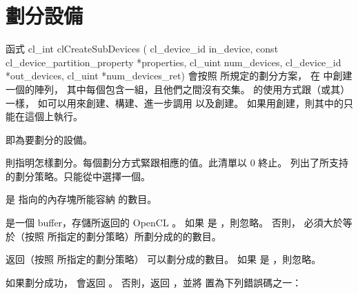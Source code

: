 \section{劃分設備}
函式
\startCLFUNC
cl_int clCreateSubDevices (
		cl_device_id in_device,
		const cl_device_partition_property *properties,
		cl_uint num_devices,
		cl_device_id *out_devices,
		cl_uint *num_devices_ret)
\stopCLFUNC
會按照  所規定的劃分方案，
在  中創建一個的陣列，
其中每個包含一組，且他們之間沒有交集。
的使用方式跟（或其）一樣，
如可以用來創建、構建、進一步調用  以及創建。
如果用創建，則其中的只能在這個上執行。

 即為要劃分的設備。

 則指明怎樣劃分。每個劃分方式緊跟相應的值。此清單以 0 終止。
列出了所支持的劃分策略。只能從中選擇一個。

{}

 是  指向的內存塊所能容納  的數目。

 是一個 buffer，存儲所返回的 OpenCL 。
如果  是 ，則忽略。
否則，  必須大於等於（按照  所指定的劃分策略）所劃分成的的數目。

 返回（按照  所指定的劃分策略） 可以劃分成的數目。
如果  是 ，則忽略。

如果劃分成功，  會返回 。
否則，返回 ，並將  置為下列錯誤碼之一：

